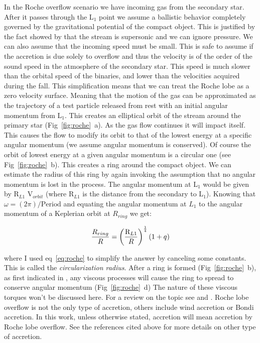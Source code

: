 In the Roche overflow scenario we have incoming gas from the secondary star. After it passes through the L$_1$ point we assume a ballistic behavior completely governed by the gravitational potential of the compact object. This is justified by the fact showed by \cite{lubow_gas_1975} that the stream is supersonic and we can ignore pressure. We can also assume that the incoming speed must be small. This is safe to assume if the accretion is due solely to overflow and thus the velocity is of the order of the sound speed in the atmosphere of the secondary star. This speed is much slower than the orbital speed of the binaries,  and lower than the velocities acquired during the fall. This simplification means that we can treat the Roche lobe as a zero velocity surface. Meaning that the motion of the gas can be approximated as the trajectory of a test particle released from rest with an initial angular momentum from L$_1$. This creates an elliptical orbit of the stream around the primary star (Fig~\ref{fig:roche}~a). As the gas flow continues it will impact itself. This causes the flow to modify its orbit to that of the lowest energy at a specific angular momentum (we assume angular momentum is conserved). Of course the orbit of lowest energy at a given angular momentum is a circular one (see Fig~\ref{fig:roche}~b). This creates a ring around the compact object.  We can estimate the radius of this ring by again invoking the assumption that no angular momentum is lost in the process. The angular momentum at L$_1$ would be given by  R$_{L1}$  V$_{orbit}$ (where R$_{L1}$ is the distance from the secondary to L$_1$). Knowing that $\omega = (2 \pi)/\text{Period}$ and equating the angular momentum at $L_1$ to the angular momentum of a Keplerian orbit at $R_{ring}$ we get:


\begin{equation}
        \frac{R_{ring}}{R} = \left ( \frac{\text R _{L1}}{R} \right ) ^{\frac{1}{4}} (1+q)
\end{equation}

where I used eq~\ref{eq:roche} to simplify the answer by canceling some constants. This is called the \emph{circularization radius}. After a ring is formed (Fig~\ref{fig:roche}~b), as first indicated in \cite{lynden-bell_evolution_1974}, any viscous processes will cause the ring to spread to conserve angular momentum (Fig~\ref{fig:roche}~d) The nature of these viscous torques won't be discussed here. For a review on the topic see \cite{frank_accretion_2002} and \cite{verbunt_accretion_1982}. Roche lobe overflow is not the only type of accretion, others include wind accretion or Bondi accretion. In this work, unless otherwise stated, accretion will mean accretion by Roche lobe overflow. See the references cited above for more details on other type of accretion. \\


